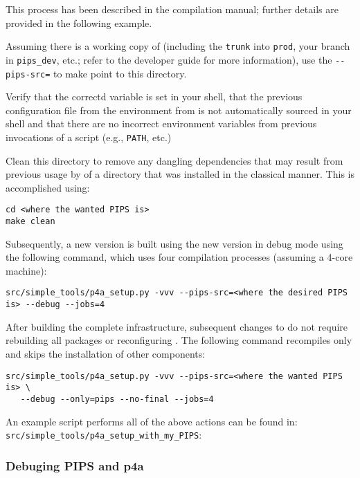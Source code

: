 \documentclass[a4paper]{article}
\begin{document}
This process has been described in the compilation manual; further details
are provided in the following example.

Assuming there is a \Asvn working copy of \Apips (including the \texttt{trunk}
into \texttt{prod}, your branch in \verb|pips_dev|, etc.; refer
to the \Apips developer guide for more information), use the
\verb|--pips-src=| to make \Apfa point to this directory.

Verify that the correctd \Apfa variable is set in your shell, that
the previous configuration file from the \Apips{} \Asvn environment from
\Acri is not automatically sourced in your shell and that there are no
incorrect environment variables from previous invocations of a script
(e.g., \verb|PATH|, etc.)

Clean this directory to remove any dangling dependencies that may
result from previous
usage by \Apfa of a \Apips directory that was installed in the
classical manner. This is accomplished using:
\begin{verbatim}
cd <where the wanted PIPS is>
make clean
\end{verbatim}

Subsequently, a new \Apfa version is built using the new \Apips
version in debug mode using the following command, which uses
four compilation processes (assuming a 4-core machine):
\begin{verbatim}
src/simple_tools/p4a_setup.py -vvv --pips-src=<where the desired PIPS is> --debug --jobs=4
\end{verbatim}

After building the complete infrastructure, subsequent changes to
\Apips do not require rebuilding all packages or reconfiguring
\Apips. The following command recompiles \Apips only and skips the
installation of other \Apfa components:
\begin{verbatim}
src/simple_tools/p4a_setup.py -vvv --pips-src=<where the wanted PIPS is> \
   --debug --only=pips --no-final --jobs=4
\end{verbatim}

An example script performs all of the above actions can be found in:
\verb|src/simple_tools/p4a_setup_with_my_PIPS|:



\subsubsection{Debuging PIPS and p4a}
\label{sec:debuging-pips-p4a}
\end{document}
